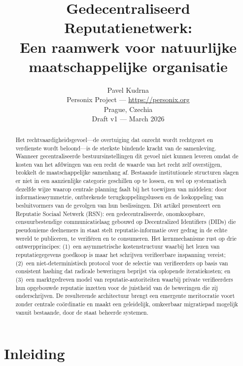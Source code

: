 \documentclass[11pt,a4paper,twocolumn]{article}
\title{\textbf{Gedecentraliseerd Reputatienetwerk:\\Een raamwerk voor natuurlijke maatschappelijke organisatie}}
\author{Pavel Kudrna\\Personix Project --- \url{https://personix.org}\\Prague, Czechia\\Draft v1 --- March 2026}
\date{}
\begin{document}
\maketitle

\begin{abstract}
Het rechtvaardigheidsgevoel---de overtuiging dat onrecht wordt rechtgezet en verdienste wordt beloond---is de sterkste bindende kracht van de samenleving. Wanneer gecentraliseerde bestuursinstellingen dit gevoel niet kunnen leveren omdat de kosten van het afdwingen van een recht de waarde van het recht zelf overstijgen, brokkelt de maatschappelijke samenhang af. Bestaande institutionele structuren slagen er niet in een aanzienlijke categorie geschillen op te lossen, en wel op systematisch dezelfde wijze waarop centrale planning faalt bij het toewijzen van middelen: door informatieasymmetrie, ontbrekende terugkoppelingslussen en de loskoppeling van besluitvormers van de gevolgen van hun beslissingen. Dit artikel presenteert een Reputatie Sociaal Netwerk (RSN): een gedecentraliseerde, onomkoopbare, censuurbestendige communicatielaag gebouwd op Decentralized Identifiers (DIDs) die pseudonieme deelnemers in staat stelt reputatie-informatie over gedrag in de echte wereld te publiceren, te verifiëren en te consumeren. Het kernmechanisme rust op drie ontwerpprincipes: (1)~een asymmetrische kostenstructuur waarbij het lezen van reputatiegegevens goedkoop is maar het schrijven verifieerbare inspanning vereist; (2)~een niet-deterministisch protocol voor de selectie van verifieerders op basis van consistent hashing dat radicale beweringen beprijst via oplopende iteratiekosten; en (3)~een marktgedreven model van reputatie-autoriteiten waarbij private verifieerders hun opgebouwde reputatie inzetten voor de juistheid van de beweringen die zij onderschrijven. De resulterende architectuur brengt een emergente meritocratie voort zonder centrale coördinatie en maakt een geleidelijk, omkeerbaar migratiepad mogelijk vanuit bestaande, door de staat beheerde systemen.
\end{abstract}

\section{Inleiding}
\end{document}
